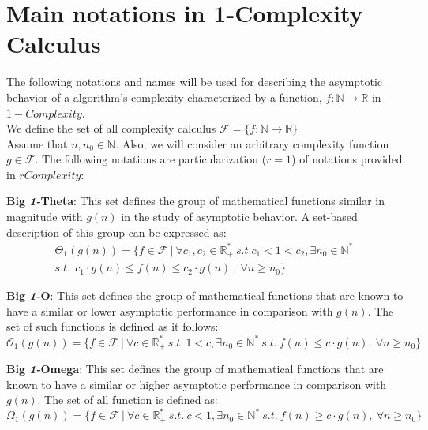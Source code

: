 \section{Main notations in 1-Complexity Calculus}
The following notations and names will be used for describing the asymptotic behavior of a algorithm's complexity characterized by a function, $f:\mathbb{N}\longrightarrow\mathbb{R}$ in $1-Complexity$. \\
We define the set of all complexity calculus $\mathcal{F}= \lbrace f:\mathbb{N}\longrightarrow\mathbb{R} \rbrace$
\\Assume that $n, n_{0}\in\mathbb{N}$. Also, we will consider an arbitrary complexity function $g \in \mathcal{F}$.
The following notations are particularization ($r = 1$) of notations provided in $rComplexity$:
\begin{definition}
    \textbf{Big \textit{1-}Theta}: This set defines the group of mathematical functions similar in magnitude with  $g(n)$ in the study of asymptotic behavior. A set-based description of this group can be expressed as:
    \[\begin{split}
          \Theta_{1}(g(n)) = \lbrace f \in \mathcal{F}\ |\ \forall c_{1}, c_{2} \in \mathbb{R}^{*}_{+} \ s.t. c_{1} < 1 < c_{2} , \exists n_{0} \in \mathbb{N}^{*}\ \\ s.t.\ \ c_{1} \cdot g(n) \leq f(n) \leq c_{2} \cdot g(n)\ ,\  \forall n \geq n_{0} \rbrace
    \end{split} \]
\end{definition}
\begin{definition}
    \textbf{Big \textit{1-}O}: This set defines the group of mathematical functions that are known to have a similar or lower
    asymptotic performance in comparison with  $g(n)$. The set of such functions is defined as it follows:
    \[\mathcal{O}_{1}(g(n)) = \lbrace f \in \mathcal{F}\ |\ \forall c  \in \mathbb{R}^{*}_{+} \ s.t.\  1 < c, \exists n_{0} \in \mathbb{N}^{*}\ s.t.\  f(n) \leq c \cdot g(n),\  \forall n \geq n_{0} \rbrace\]
\end{definition}
\begin{definition}

    \textbf{Big \textit{1-}Omega}: This set defines the group of mathematical functions that are known to have a similar or higher asymptotic performance in comparison with  $g(n)$. The set of all function is defined as:
    \[\Omega_{1}(g(n)) = \lbrace f \in \mathcal{F}\ |\ \forall c  \in \mathbb{R}^{*}_{+}\ s.t. \ c < 1, \exists n_{0} \in \mathbb{N}^{*}\ s.t.\  f(n) \geq c \cdot g(n),\  \forall n \geq n_{0} \rbrace\]
\end{definition}
